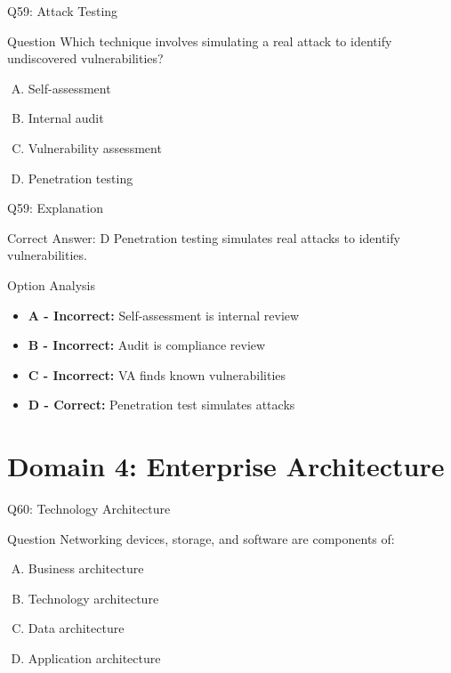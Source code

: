 \documentclass{beamer}
\begin{document}
	\begin{frame}{Q59: Attack Testing}
		\begin{block}{Question}
			Which technique involves simulating a real attack to identify undiscovered vulnerabilities?
		\end{block}
		\begin{enumerate}[(A)]
			\item Self-assessment
			\item Internal audit
			\item Vulnerability assessment
			\item Penetration testing
		\end{enumerate}
	\end{frame}
	
	\begin{frame}{Q59: Explanation}
		\begin{block}{Correct Answer: D}
			Penetration testing simulates real attacks to identify vulnerabilities.
		\end{block}
		\begin{block}{Option Analysis}
			\begin{itemize}
				\item \textbf{A - Incorrect:} Self-assessment is internal review
				\item \textbf{B - Incorrect:} Audit is compliance review
				\item \textbf{C - Incorrect:} VA finds known vulnerabilities
				\item \textbf{D - Correct:} Penetration test simulates attacks
			\end{itemize}
		\end{block}
	\end{frame}
	
	
	\section{Domain 4: Enterprise Architecture}
	
	\begin{frame}{Q60: Technology Architecture}
		\begin{block}{Question}
			Networking devices, storage, and software are components of:
		\end{block}
		\begin{enumerate}[(A)]
			\item Business architecture
			\item Technology architecture
			\item Data architecture
			\item Application architecture
		\end{enumerate}
	\end{frame}
	
\end{document}
